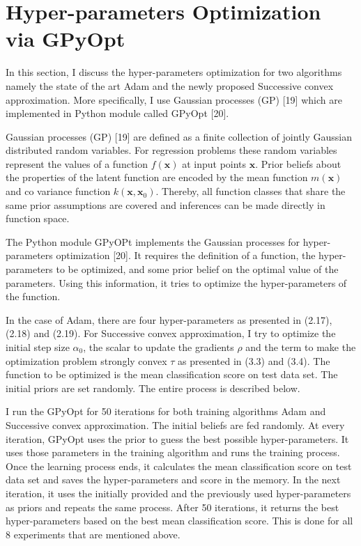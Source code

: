 \section {Hyper-parameters Optimization via GPyOpt}

In this section, I discuss the hyper-parameters optimization for two algorithms namely the state of the art Adam and the newly proposed Successive convex approximation. More specifically, I use Gaussian processes (GP) [19] which are implemented in Python module called GPyOpt [20].

Gaussian processes (GP) [19] are defined as a finite collection of jointly Gaussian distributed random variables. For regression problems these random variables represent the values of a function $f(\textbf{x})$ at input points $\textbf{x}$. Prior beliefs about the properties of the latent function are encoded by the mean function $m(\textbf{x})$ and co variance function $k(\textbf{x}, \textbf{x}_0)$. Thereby, all function classes that share the same prior assumptions are covered and inferences can be made directly in function space. 

The Python module GPyOPt implements the Gaussian processes for hyper-parameters optimization [20]. It requires the definition of a function, the hyper-parameters to be optimized, and some prior belief on the optimal value of the parameters. Using this information, it tries to optimize the hyper-parameters of the function. 

In the case of Adam, there are four hyper-parameters as presented in (2.17), (2.18) and (2.19). For Successive convex approximation, I try to optimize the initial step size $\alpha_0$, the scalar to update the gradients $\rho$ and the term to make the optimization problem strongly convex $\tau$ as presented in (3.3) and (3.4). The function to be optimized is the mean classification score on test data set. The initial priors are set randomly. The entire process is described below.

I run the GPyOpt for 50 iterations for both training algorithms Adam and Successive convex approximation. The initial beliefs are fed randomly. At every iteration, GPyOpt uses the prior to guess the best possible hyper-parameters. It uses those parameters in the training algorithm and runs the training process. Once the learning process ends, it calculates the mean classification score on test data set and saves the hyper-parameters and score in the memory. In the next iteration, it uses the initially provided and the previously used hyper-parameters as priors and repeats the same process. After 50 iterations, it returns the best hyper-parameters based on the best mean classification score. This is done for all 8 experiments that are mentioned above.

